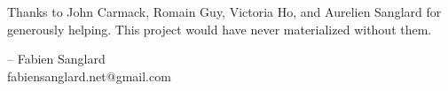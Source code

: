 Thanks to John Carmack, Romain Guy, Victoria Ho, and Aurelien Sanglard for generously helping. This project would have never
materialized without them.\\ 
\par
-- Fabien Sanglard\\
fabiensanglard.net@gmail.com
